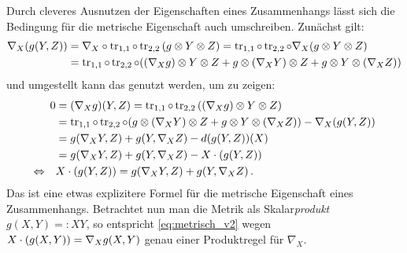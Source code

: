 Durch cleveres Ausnutzen der Eigenschaften eines Zusammenhangs lässt sich die Bedingung für die metrische Eigenschaft auch umschreiben. Zunächst gilt:
\begin{align*}
\nabla_X \qty(g(Y, Z)) &= \nabla_X \circ \tr_{1, 1} \circ \tr_{2, 2} \qty(g \otimes Y \otimes Z) = \tr_{1, 1} \circ \tr_{2, 2} \circ \nabla_X \qty(g \otimes Y \otimes Z) 
\\
&= \tr_{1, 1} \circ \tr_{2, 2} \circ \qty(\qty(\nabla_X g) \otimes Y \otimes Z + g \otimes \qty(\nabla_X Y) \otimes Z + g \otimes Y \otimes \qty(\nabla_X Z))
\end{align*}
und umgestellt kann das genutzt werden, um zu zeigen:
\begin{align}
0 &= \qty(\nabla_X g)(Y, Z) = \tr_{1, 1} \circ \tr_{2, 2} \qty(\qty(\nabla_X g) \otimes Y \otimes Z)
\notag\\
&= \tr_{1, 1} \circ \tr_{2, 2} \circ \qty(g \otimes \qty(\nabla_X Y) \otimes Z + g \otimes Y \otimes \qty(\nabla_X Z)) - \nabla_X \qty(g(Y, Z))
\notag\\
&= g\qty(\nabla_X Y, Z) + g\qty(Y, \nabla_X Z) - d \qty(g(Y, Z))(X)
\notag\\
&= g\qty(\nabla_X Y, Z) + g\qty(Y, \nabla_X Z) - X \cdot \qty(g(Y, Z))
\notag\\
\Leftrightarrow \quad & X \cdot \qty(g(Y, Z)) = g\qty(\nabla_X Y, Z) + g\qty(Y, \nabla_X Z) \, . \label{eq:metrisch_v2}
\end{align}
Das ist eine etwas explizitere Formel für die metrische Eigenschaft eines Zusammenhangs. Betrachtet nun man die Metrik als Skalar\emph{produkt} $g(X, Y) =: X Y$, so entspricht \eqref{eq:metrisch_v2} wegen $X \cdot \qty(g(X, Y)) = \nabla_X g(X, Y)$ genau einer Produktregel für $\nabla_X$.\\



